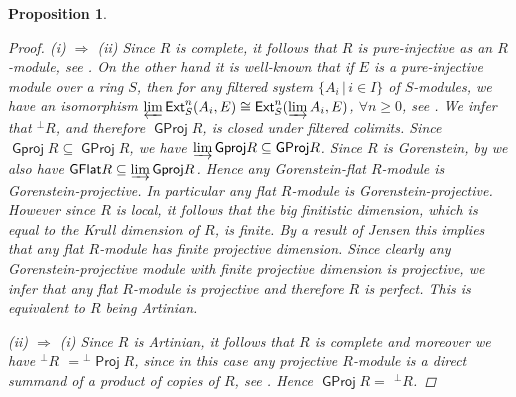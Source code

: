 \documentclass[oneside, a4paper,reqno]{amsart}
\numberwithin{equation}{section}
\newtheorem{prop}[thm]{Proposition}
\theoremstyle{definition}
\begin{document}
\begin{prop}
\begin{proof}
(i) $\Rightarrow$ (ii) Since $R$ is complete, it
follows that $R$ is pure-injective as an $R$-module, see \cite{JL}.
On the other hand it is well-known that if $E$ is a pure-injective
module over a ring $S$, then for any filtered system $\{A_{i}\, | \,
i \in I\}$ of $S$-modules, we have an isomorphism
$\operatorname*{\varprojlim}\operatorname*{\mathsf{Ext}}^{n}_{S}(A_{i},E) \cong \operatorname*{\mathsf{Ext}}^{n}_{S}(\operatorname*{\varinjlim} A_{i},E)$,
$\forall n \geq 0$, see \cite[Chap. 1, Proposition 10.1]{Auslander:functors}. We infer that
${^{\pmb{\bot}}}R$, and therefore ${\operatorname{\mathsf{GProj}}\nolimits} R$, is closed under
filtered colimits. Since ${\operatorname{\mathsf{Gproj}}\nolimits} R \subseteq {\operatorname{\mathsf{GProj}}\nolimits} R$, we have
$\operatorname*{\varinjlim}{\operatorname{\mathsf{Gproj}}\nolimits} R \subseteq {\operatorname{\mathsf{GProj}}\nolimits} R$. Since $R$ is Gorenstein, by \cite{EJ} we also have
${\operatorname{\mathsf{GFlat}}\nolimits} R \subseteq \operatorname*{\varinjlim}{\operatorname{\mathsf{Gproj}}\nolimits} R$. Hence any Gorenstein-flat
$R$-module is Gorenstein-projective. In particular any flat
$R$-module is Gorenstein-projective. However since $R$ is local, it
follows that the big finitistic dimension, which is equal to the
Krull dimension of $R$, is finite. By a result of Jensen
\cite{Jensen} this implies that any flat $R$-module has finite
projective dimension. Since clearly any Gorenstein-projective module
with finite projective dimension is projective, we infer that any
flat $R$-module is projective and therefore $R$ is perfect. This is
equivalent to $R$ being Artinian.

(ii) $\Rightarrow$ (i) Since $R$
is Artinian, it follows that $R$ is complete and moreover  we have ${^{\pmb{\bot}}}R$ $= {^{\bot}}\operatorname*{\mathsf{Proj}} R$, since in
this case any projective $R$-module is a direct summand of a product
of copies of $R$, see \cite{KS}. Hence ${\operatorname{\mathsf{GProj}}\nolimits} R =$ ${^{\pmb{\bot}}}R$.
\end{proof}
\end{prop}
\end{document}

